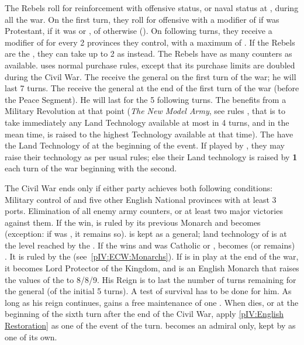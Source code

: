 \phadm
\aparag[Reinforcements]
\bparag The Rebels roll for reinforcement with offensive status, or naval
status at , during all the war. On the first turn, they roll for
offensive with a modifier of  if \ENG was Protestant,  if
it was \CATHCR or \PROTANG, of  otherwise (\CATHCO).
\bparag On following turns, they receive a modifier of  for every 2
provinces they control, with a maximum of .
\bparag If the Rebels are the \parl, they can take up to 2 \LD as \ND instead.
\bparag The Rebels have as many counters as \ENG available.
\aparag \ENG uses normal purchase rules, except that its purchase limits are
doubled during the Civil War.
\aparag The \royal receive the general  on the first
turn of the war; he will last 7 turns.%
\aparag The \parl receive the general  at the end of
the first turn of the war (before the Peace Segment).  He will last for the 5
following turns. The \parl benefits from a Military Revolution at that point
(\textit{The New Model Army}, see rules , that is to take immediately any Land Technology available at
most in 4 turns, and in the mean time, is raised to the highest Technology
available at that time).
\aparag The \royal have the Land Technology of \ENG at the beginning of the
event. If played by \ENG, they may raise their technology as per usual rules;
else their Land technology is raised by {\bf 1} each turn of the war beginning
with the second.

\phpaix
\aparag The Civil War ends only if either party achieves both following
conditions:
\bparag Military control of  and five other English
National provinces with at least 3 ports.
\bparag Elimination of all enemy army counters, or at least two major
victories against them.
\aparag If the \royal win, \ENG is ruled by its previous Monarch and becomes
\CATHCR (exception: if \ENG was \CATHCO, it remains so). \leaderRupertroy is
kept as a general; land technology of \ENG is at the level reached by the
\royal.
\aparag If the \parl wins and \ENG was Catholic or \PROTANG, \ENG becomes (or
remains) \PROTANG.  It is ruled by the 
(see~\ref{pIV:ECW:Monarchs}).
\bparag If \leaderCromwell is in play at the end of the war, it becomes Lord
Protector of the Kingdom, and is an English Monarch that raises the values of
the  to 8/8/9. His Reign is to last the number of turns
remaining for the general (of the initial 5 turns).  A test of survival has to
be done for him. As long as his reign continues, \ENG gains a free maintenance
of one \ARMY\faceplus.
\bparag When \leaderCromwell dies, or at the beginning of the sixth turn after
the end of the Civil War, apply \ref{pIV:English Restoration} as one of the
event of the turn.
\bparag \leaderRupertang becomes an admiral only, kept by \ENG as one of its
own.

